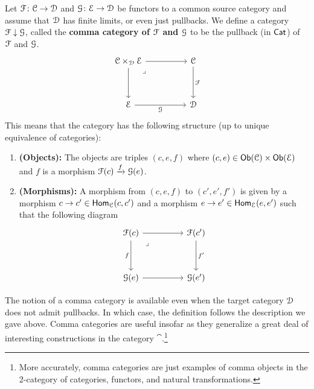 \documentclass{amsbook}
\begin{document}
\begin{definition}
    Let $\mathcal F \colon \mathcal C \rightarrow \mathcal D$ and $\mathcal G\colon \mathcal E \rightarrow \mathcal D$ be functors to a common source category and assume that $\mathcal D$ has finite limits, or even just pullbacks. We define a category $\mathcal F \downarrow \mathcal G$, called the \textbf{comma category of $\mathcal F$ and $\mathcal G$} to be the pullback (in $\operatorname{{\sf Cat}}$) of $\mathcal F$ and $\mathcal G$.
    \begin{equation}
        \begin{tikzcd}
            {\cC \times_{\cD} \cE} && \cC \\
            \\
            \cE && \cD
            \arrow[from=1-1, to=1-3]
            \arrow[from=1-1, to=3-1]
            \arrow["\lrcorner"{anchor=center, pos=0.125}, draw=none, from=1-1, to=3-3]
            \arrow["\cF", from=1-3, to=3-3]
            \arrow["\cG"', from=3-1, to=3-3]
        \end{tikzcd}
    \end{equation}
    This means that the category has the following structure (up to unique equivalence of categories):
    \begin{enumerate}
        \item \textbf{(Objects):} The objects are triples $(c,e,f)$ where $(c,e)\in \mathsf{Ob}(\mathcal C)\times \mathsf{Ob}(\mathcal E)$ and $f$ is a morphism $\mathcal F(c)\xrightarrow{f}\mathcal G(e)$.
        \item \textbf{(Morphisms):} A morphism from $(c,e,f)$ to $(c',e',f')$ is given by a morphism $c \rightarrow c'\in \operatorname{\sf Hom}_{\mathcal C}(c,c')$ and a morphism $e \rightarrow e'\in \operatorname{\sf Hom}_{\mathcal E}(e,e')$ such that the following diagram  
        \begin{equation}
            \begin{tikzcd}
            {\cF(c)} && {\cF(c')} \\
            \\
            {\cG(e)} && {\cG(e')}
            \arrow[from=1-1, to=1-3]
            \arrow["f"', from=1-1, to=3-1]
            \arrow["\lrcorner"{anchor=center, pos=0.125}, draw=none, from=1-1, to=3-3]
            \arrow["{f'}", from=1-3, to=3-3]
            \arrow[from=3-1, to=3-3]
        \end{tikzcd}
        \end{equation}
    \end{enumerate}
\end{definition}

The notion of a comma category is available even when the target category $\mathcal D$ does not admit pullbacks. In which case, the definition follows the description we gave above. Comma categories are useful insofar as they generalize a great deal of interesting constructions in the category $\cat$.\footnote{More accurately, comma categories are just examples of comma objects in the 2-category of categories, functors, and natural transformations.}
\end{document}
